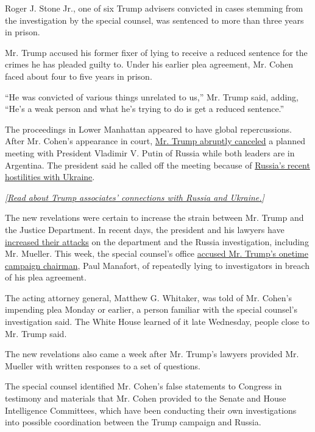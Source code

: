 Roger J. Stone Jr., one of six Trump advisers convicted in cases
stemming from the investigation by the special counsel, was sentenced to
more than three years in prison.

Mr. Trump accused his former fixer of lying to receive a reduced
sentence for the crimes he has pleaded guilty to. Under his earlier plea
agreement, Mr. Cohen faced about four to five years in prison.

``He was convicted of various things unrelated to us,'' Mr. Trump said,
adding, ``He's a weak person and what he's trying to do is get a reduced
sentence.''

The proceedings in Lower Manhattan appeared to have global
repercussions. After Mr. Cohen's appearance in court,
\href{https://www.nytimes3xbfgragh.onion/2018/11/29/us/politics/trump-putin-meeting-g20.html}{Mr.
Trump abruptly canceled} a planned meeting with President Vladimir V.
Putin of Russia while both leaders are in Argentina. The president said
he called off the meeting because of
\href{https://www.nytimes3xbfgragh.onion/2018/11/26/world/europe/russia-ukraine-kerch-strait.html}{Russia's
recent hostilities with Ukraine}.

\emph{{[}}\href{https://www.nytimes3xbfgragh.onion/2017/02/19/us/politics/donald-trump-ukraine-russia.html}{\emph{Read
about Trump associates' connections with Russia and Ukraine.}}\emph{{]}}

The new revelations were certain to increase the strain between Mr.
Trump and the Justice Department. In recent days, the president and his
lawyers have
\href{https://www.nytimes3xbfgragh.onion/2018/11/15/us/politics/trump-mueller-russia-inquiry.html}{increased
their attacks} on the department and the Russia investigation, including
Mr. Mueller. This week, the special counsel's office
\href{https://www.nytimes3xbfgragh.onion/2018/11/26/us/politics/mueller-paul-manafort-cooperation.html}{accused
Mr. Trump's onetime campaign chairman}, Paul Manafort, of repeatedly
lying to investigators in breach of his plea agreement.

The acting attorney general, Matthew G. Whitaker, was told of Mr.
Cohen's impending plea Monday or earlier, a person familiar with the
special counsel's investigation said. The White House learned of it late
Wednesday, people close to Mr. Trump said.

The new revelations also came a week after Mr. Trump's lawyers provided
Mr. Mueller with written responses to a set of questions.

The special counsel identified Mr. Cohen's false statements to Congress
in testimony and materials that Mr. Cohen provided to the Senate and
House Intelligence Committees, which have been conducting their own
investigations into possible coordination between the Trump campaign and
Russia.

